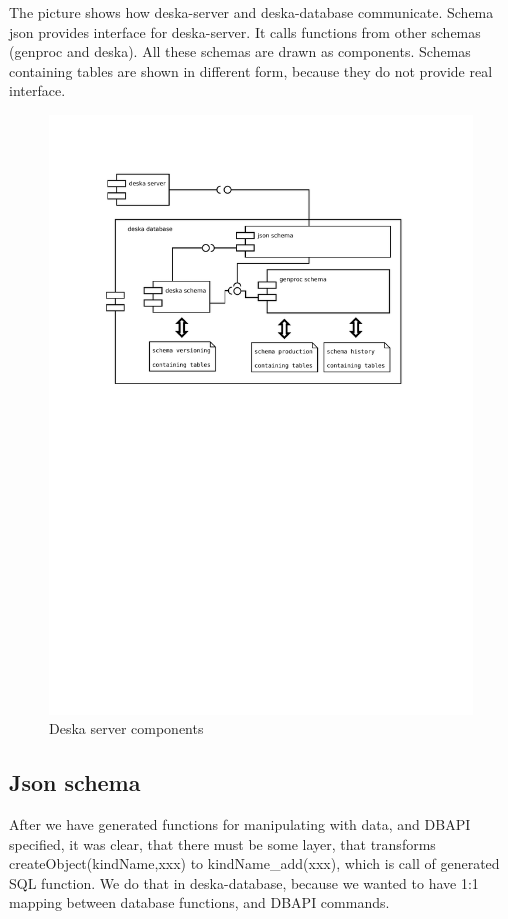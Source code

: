 \documentclass[deska]{subfiles}
\begin{document}
The picture shows how deska-server and deska-database communicate. Schema json provides interface for deska-server. It
calls functions from other schemas (genproc and deska). All these schemas are drawn as components. Schemas containing
tables are shown in different form, because they do not provide real interface.
\begin{figure}[h]
	\centering
	\includegraphics[trim=28mm 170mm 30mm 28mm]{img-deska-server-components.pdf}
	\caption{Deska server components}
\end{figure}

\subsection{Json schema}
\label{sec:schema-json}
After we have generated functions for manipulating with data, and DBAPI specified, it was clear, that there must be some layer,
that transforms createObject(kindName,xxx) to kindName\_add(xxx), which is call of generated SQL function.
We do that in deska-database, because we wanted to have 1:1 mapping between database functions, and DBAPI commands.
\end{document}
